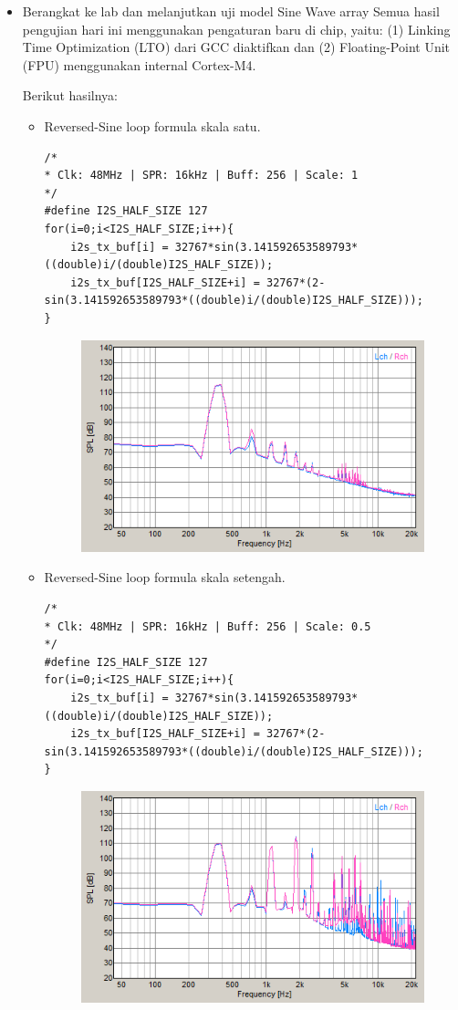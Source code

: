 \documentclass[12pt,]{article}
\begin{document}
	\begin{itemize}
		\item Berangkat ke lab dan melanjutkan uji model Sine Wave array
		Semua hasil pengujian hari ini menggunakan pengaturan baru di chip, yaitu:
		(1) Linking Time Optimization (LTO) dari GCC diaktifkan dan
		(2) Floating-Point Unit (FPU) menggunakan internal Cortex-M4.
		
		Berikut hasilnya:
		\begin{itemize}
			\item Reversed-Sine loop formula skala satu.
			\begin{verbatim}
/*
* Clk: 48MHz | SPR: 16kHz | Buff: 256 | Scale: 1
*/
#define I2S_HALF_SIZE 127	
for(i=0;i<I2S_HALF_SIZE;i++){
	i2s_tx_buf[i] = 32767*sin(3.141592653589793*((double)i/(double)I2S_HALF_SIZE));
	i2s_tx_buf[I2S_HALF_SIZE+i] = 32767*(2-sin(3.141592653589793*((double)i/(double)I2S_HALF_SIZE)));
}
			\end{verbatim}
			\begin{figure}[H]
				\centering
				\includegraphics[width=0.5\linewidth]{result/day_2/tone1}
			\end{figure}
		
			\item Reversed-Sine loop formula skala setengah.
			\begin{verbatim}
/*
* Clk: 48MHz | SPR: 16kHz | Buff: 256 | Scale: 0.5
*/
#define I2S_HALF_SIZE 127	
for(i=0;i<I2S_HALF_SIZE;i++){
	i2s_tx_buf[i] = 32767*sin(3.141592653589793*((double)i/(double)I2S_HALF_SIZE));
	i2s_tx_buf[I2S_HALF_SIZE+i] = 32767*(2-sin(3.141592653589793*((double)i/(double)I2S_HALF_SIZE)));
}
			\end{verbatim}
			\begin{figure}[H]
				\centering
				\includegraphics[width=0.5\linewidth]{result/day_2/tone05}
			\end{figure}
		

\end{itemize}
\end{itemize}
\end{document}
